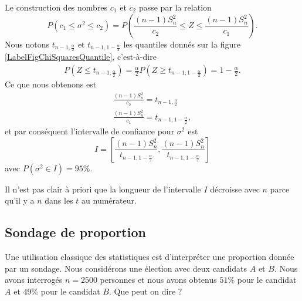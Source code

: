 \begin{example}
	Le construction des nombres \( c_1\) et \( c_2\) passe par la relation
	\begin{equation}
		P(c_1\leq \sigma^2\leq c_2)=P\left( \frac{ (n-1)S_n^2 }{ c_2 }\leq Z\leq\frac{ (n-1)S_n^2 }{ c_1 } \right).
	\end{equation}
	Nous notons \( t_{n-1,\frac{ \alpha }{2}}\) et \( t_{n-1,1-\frac{ \alpha }{2}}\) les quantiles donnés sur la figure \ref{LabelFigChiSquaresQuantile}, c'est-à-dire
	\begin{subequations}
		\begin{align}
			P(Z\leq t_{n-1,\frac{ \alpha }{2}})=\frac{ \alpha }{2}
			P(Z\geq t_{n-1,1-\frac{ \alpha }{2}})=1-\frac{ \alpha }{2}.
		\end{align}
	\end{subequations}
	Ce que nous obtenons est
	\begin{subequations}
		\begin{align}
			\frac{ (n-1)S_n^2 }{ c_2 }=t_{n-1,\frac{ \alpha }{2}} \\
			\frac{ (n-1)S_n^2 }{ c_1 }=t_{n-1,1-\frac{ \alpha }{2}},
		\end{align}
	\end{subequations}
	et par conséquent l'intervalle de confiance pour \( \sigma^2\) est
	\begin{equation}
		I=\left[ \frac{ (n-1)S_n^2 }{ t_{n-1,1-\frac{ \alpha }{2}} },\frac{ (n-1)S_n^2 }{ t_{n-1,1-\frac{ \alpha }{2}} } \right]
	\end{equation}
	avec \( P(\sigma^2\in I)=95\%\).

	\begin{remark}
		Il n'est pas clair à priori que la longueur de l'intervalle \( I\) décroisse avec \( n\) parce qu'il y a \( n\) dans les \( t\) au numérateur.
	\end{remark}

\end{example}

\subsection{Sondage de proportion}

Une utilisation classique des statistiques est d'interpréter une proportion donnée par un sondage. Nous considérons une élection avec deux candidats \( A\) et \( B\). Nous avons interrogés \( n=2500\) personnes et nous avons obtenus \( 51\%\) pour le candidat \( A\) et \( 49\%\) pour le candidat \( B\). Que peut on dire ?

